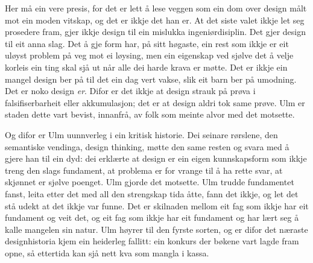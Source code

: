 Her må ein vere presis, for det er lett å lese veggen som ein dom over design målt mot ein moden vitskap, og det er ikkje det han er. At det siste valet ikkje let seg prosedere fram, gjer ikkje design til ein mislukka ingeniørdisiplin. Det gjer design til eit anna slag. Det å gje form har, på sitt høgaste, ein rest som ikkje er eit uløyst problem på veg mot ei løysing, men ein eigenskap ved sjølve det å velje korleis ein ting skal sjå ut når alle dei harde krava er møtte. Det er ikkje ein mangel design ber på til det ein dag vert vakse, slik eit barn ber på umodning. Det er noko design \emph{er}. Difor er det ikkje at design strauk på prøva i falsifiserbarheit eller akkumulasjon; det er at design aldri tok same prøve. Ulm er staden dette vart bevist, innanfrå, av folk som meinte alvor med det motsette.

Og difor er Ulm uunnverleg i ein kritisk historie. Dei seinare rørslene, den semantiske vendinga, design thinking, møtte den same resten og svara med å gjere han til ein dyd: dei erklærte at design er ein eigen kunnskapsform som ikkje treng den slags fundament, at problema er for vrange til å ha rette svar, at skjønnet er sjølve poenget. Ulm gjorde det motsette. Ulm trudde fundamentet fanst, leita etter det med all den strengskap tida åtte, fann det ikkje, og let det stå udekt at det ikkje var funne. Det er skilnaden mellom eit fag som ikkje har eit fundament og veit det, og eit fag som ikkje har eit fundament og har lært seg å kalle mangelen sin natur. Ulm høyrer til den fyrste sorten, og er difor det næraste designhistoria kjem ein heiderleg fallitt: ein konkurs der bøkene vart lagde fram opne, så ettertida kan sjå nett kva som mangla i kassa.


